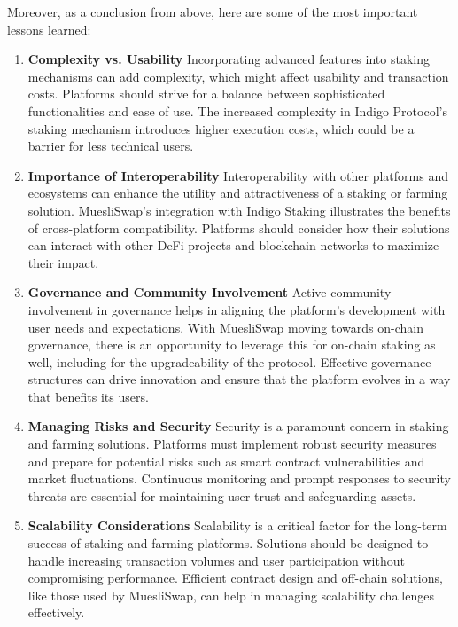 \documentclass[12pt,parskip=full, tikz]{article}
\begin{document}
Moreover, as a conclusion from above, here are some of the most important lessons learned:
\begin{enumerate}
    \item \textbf{Complexity vs. Usability}
    Incorporating advanced features into staking mechanisms can add complexity, which might affect usability and transaction costs. Platforms should strive for a balance between sophisticated functionalities and ease of use. The increased complexity in Indigo Protocol’s staking mechanism introduces higher execution costs, which could be a barrier for less technical users.

    \item \textbf{Importance of Interoperability}
    Interoperability with other platforms and ecosystems can enhance the utility and attractiveness of a staking or farming solution. MuesliSwap’s integration with Indigo Staking illustrates the benefits of cross-platform compatibility. Platforms should consider how their solutions can interact with other DeFi projects and blockchain networks to maximize their impact.

    \item \textbf{Governance and Community Involvement}
    Active community involvement in governance helps in aligning the platform’s development with user needs and expectations. With MuesliSwap moving towards on-chain governance, there is an opportunity to leverage this for on-chain staking as well, including for the upgradeability of the protocol. Effective governance structures can drive innovation and ensure that the platform evolves in a way that benefits its users.

    \item \textbf{Managing Risks and Security}
    Security is a paramount concern in staking and farming solutions. Platforms must implement robust security measures and prepare for potential risks such as smart contract vulnerabilities and market fluctuations. Continuous monitoring and prompt responses to security threats are essential for maintaining user trust and safeguarding assets.

    \item \textbf{Scalability Considerations}
    Scalability is a critical factor for the long-term success of staking and farming platforms. Solutions should be designed to handle increasing transaction volumes and user participation without compromising performance. Efficient contract design and off-chain solutions, like those used by MuesliSwap, can help in managing scalability challenges effectively.
\end{enumerate}
\end{document}
